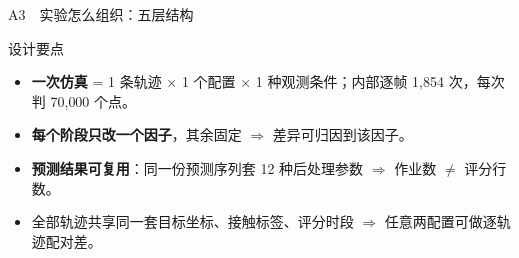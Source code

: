 \documentclass[aspectratio=169,10pt]{ctexbeamer}
\begin{document}
\begin{frame}{A3\ \ 实验怎么组织：五层结构}
  \vspace{0.2em}
  \begin{block}{设计要点}
    \footnotesize
    \begin{itemize}\setlength{\itemsep}{2pt}
      \item \textbf{一次仿真} = 1 条轨迹 × 1 个配置 × 1 种观测条件；内部逐帧 1{,}854 次，每次判 70{,}000 个点。
      \item \textbf{每个阶段只改一个因子}，其余固定 $\Rightarrow$ 差异可归因到该因子。
      \item \textbf{预测结果可复用}：同一份预测序列套 12 种后处理参数 $\Rightarrow$ 作业数 $\ne$ 评分行数。
      \item 全部轨迹共享同一套目标坐标、接触标签、评分时段 $\Rightarrow$ 任意两配置可做逐轨迹配对差。
    \end{itemize}
  \end{block}
\end{frame}
\end{document}
